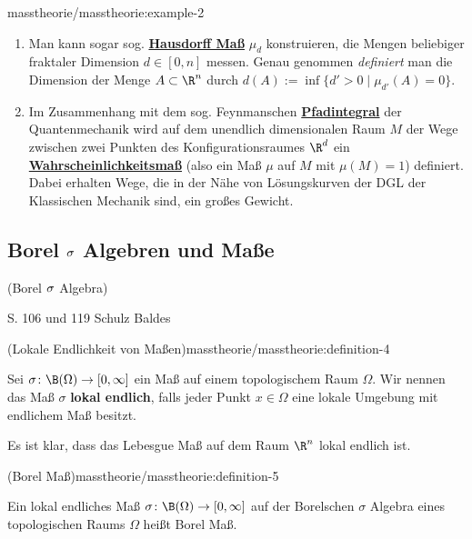 \begin{example}{}{masstheorie/masstheorie:example-2}
\begin{enumerate}
\item {} 
\par
Man kann sogar sog. \href{https://de.wikipedia.org/wiki/Hausdorff-Ma\%c3\%9f}{\textbf{Hausdorff Maß}} \(\mu_d\) konstruieren, die Mengen beliebiger fraktaler Dimension \(d\in[0,n]\) messen. Genau genommen \emph{definiert} man die Dimension der Menge \(A\subset \R^n\) durch \(d(A):=\inf\{d'>0\mid \mu_{d'}(A)=0\}.\)

\item {} 
\par
Im Zusammenhang mit dem sog. Feynmanschen \href{https://de.wikipedia.org/wiki/Pfadintegral}{\textbf{Pfadintegral}} der Quantenmechanik wird auf dem unendlich dimensionalen Raum \(M\) der Wege zwischen zwei Punkten des Konfigurationsraumes \(\R^d\) ein \href{https://de.wikipedia.org/wiki/Wahrscheinlichkeitsma\%c3\%9f}{\textbf{Wahrscheinlichkeitsmaß}} (also ein Maß \(\mu\) auf \(M\) mit \(\mu (M)=1\)) definiert. Dabei erhalten Wege, die in der Nähe von Lösungskurven der DGL der Klassischen Mechanik sind, ein großes Gewicht.

\end{enumerate}
\end{example}


\subsection{Borel \protect\(\sigma\protect\) Algebren und  Maße}
\begin{definition}{(Borel \protect\(\sigma\protect\) Algebra)}{}\label{masstheorie/masstheorie:definition-3}



\par
S. 106 und 119 Schulz Baldes
\end{definition}
\begin{definition}{(Lokale Endlichkeit von Maßen)}{masstheorie/masstheorie:definition-4}



\par
Sei \(\sigma \colon \B(\Omega) \rightarrow [0, \infty]\) ein Maß auf einem topologischem Raum \(\Omega\).
Wir nennen das Maß \(\sigma\) \textbf{lokal endlich}, falls jeder Punkt \(x \in \Omega\) eine lokale Umgebung mit endlichem Maß besitzt.
\end{definition}

\par
Es ist klar, dass das Lebesgue Maß auf dem Raum \(\R^n\) lokal endlich ist.
\begin{definition}{(Borel Maß)}{masstheorie/masstheorie:definition-5}



\par
Ein lokal endliches Maß \(\sigma \colon \B(\Omega) \rightarrow [0, \infty]\) auf der Borelschen \(\sigma\) Algebra eines topologischen Raums \(\Omega\) heißt Borel Maß.
\end{definition}


